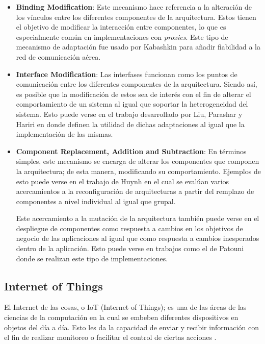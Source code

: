 \documentclass[12pt]{article}
\begin{document}
\begin{itemize}
	\item \textbf{Binding Modification}: Este mecanismo hace referencia a la alteración de los vínculos entre los diferentes componentes de la arquitectura. Estos tienen el objetivo de modificar la interacción entre componentes, lo que es especialmente común en implementaciones con \textit{proxies}. Este tipo de mecanismo de adaptación fue usado por Kabashkin \citeyear{Kabashkin_2017} para añadir fiabilidad a la red de comunicación aérea.

	\item \textbf{Interface Modification}: Las interfases funcionan como los puntos de comunicación entre los diferentes componentes de la arquitectura. Siendo así, es posible que la modificación de estos sea de interés con el fin de alterar el comportamiento de un sistema al igual que soportar la heterogeneidad del sistema. Esto puede verse en el trabajo desarrollado por Liu, Parashar y Hariri \citeyear{Liu_2004} en donde definen la utilidad de dichas adaptaciones al igual que la implementación de las mismas.

	\item \textbf{Component Replacement, Addition and Subtraction}: En términos simples, este mecanismo se encarga de alterar los componentes que componen la arquitectura; de esta manera, modificando su comportamiento. Ejemplos de esto puede verse en el trabajo de Huynh \citeyear{Huynh_2019} en el cual se evalúan varios acercamientos a la reconfiguración de arquitecturas a partir del remplazo de componentes a nivel individual al igual que grupal.

	      Este acercamiento a la mutación de la arquitectura también puede verse en el despliegue de componentes como respuesta a cambios en los objetivos de negocio de las aplicaciones al igual que como respuesta a cambios inesperados dentro de la aplicación. Esto puede verse en trabajos como el de Patouni \citeyear{Patouni_2006} donde se realizan este tipo de implementaciones.

\end{itemize}

\subsection{Internet of Things}


El Internet de las cosas, o IoT (Internet of Things); es una de las áreas de las ciencias de la computación en la cual  se embeben diferentes dispositivos en objetos del día a día. Esto les da la capacidad de enviar y recibir información con el fin de realizar monitoreo o facilitar el control de ciertas acciones \cite{Berte_2018}.
\end{document}
